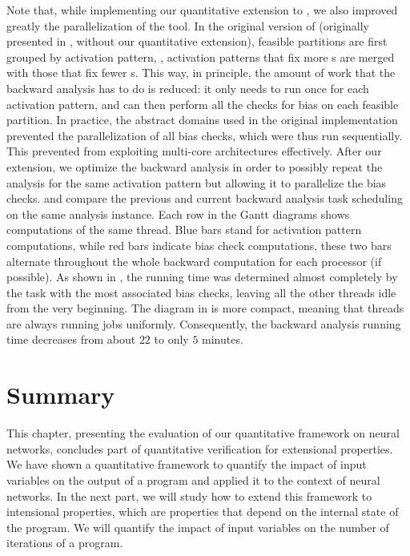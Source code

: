 Note that, while implementing our quantitative extension to \libra, we also improved greatly the parallelization of the tool.
In the original version of \libra{} (originally presented in , without our quantitative extension), feasible partitions are first grouped by activation pattern, \ie, activation patterns that fix more \relu s are merged with those that fix fewer \relu s.
This way, in principle, the amount of work that the backward analysis has to do is reduced: it only needs to run once for each activation pattern, and can then perform all the checks for bias on each feasible partition. In practice, the abstract domains used in the original implementation prevented the parallelization of all bias checks, which were thus run sequentially. This prevented \libra{} from exploiting multi-core architectures effectively. %
%
After our extension, we optimize the backward analysis in order to possibly repeat the analysis for the same activation pattern but allowing it to parallelize the bias checks.
 and  compare the previous and current backward analysis task scheduling on the same analysis instance. Each row in the Gantt diagrams shows computations of the same thread. Blue bars stand for activation pattern computations, while red bars indicate bias check computations, these two bars alternate throughout the whole backward computation for each processor (if possible).
As shown in , the running time was determined almost completely by the task with the most associated bias checks, leaving all the other threads idle from the very beginning. The diagram in  is more compact, meaning that threads are always running jobs uniformly. Consequently, the backward analysis running time decreases from about $22$ to only $5$ minutes.



\section{Summary}

This chapter, presenting the evaluation of our quantitative framework on neural networks, concludes part of quantitative verification for extensional properties.
We have shown a quantitative framework to quantify the impact of input variables on the output of a program and applied it to the context of neural networks.
In the next part, we will study how to extend this framework to intensional properties, which are properties that depend on the internal state of the program.
We will quantify the impact of input variables on the number of iterations of a program.


